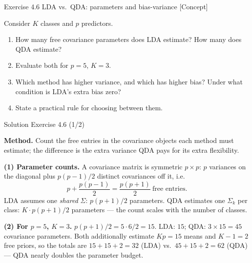 \documentclass[aspectratio=169,11pt]{beamer}
\begin{document}
\begin{frame}{Exercise 4.6 \textemdash{} LDA vs.\ QDA: parameters and bias-variance [Concept]}
\begin{exercise}
Consider $K$ classes and $p$ predictors.
\begin{enumerate}
  \item How many free covariance parameters does LDA estimate?
        How many does QDA estimate?
  \item Evaluate both for $p=5$, $K=3$.
  \item Which method has higher variance, and which has higher bias?
        Under what condition is LDA's extra bias zero?
  \item State a practical rule for choosing between them.
\end{enumerate}
\end{exercise}
\end{frame}

\begin{frame}{Solution \textemdash{} Exercise 4.6 (1/2)}
\begin{solutionbox}
\textbf{Method.} Count the free entries in the covariance objects each
method must estimate; the difference is the extra variance QDA pays for
its extra flexibility.

\vspace{1mm}
\textbf{(1) Parameter counts.}
A covariance matrix is symmetric $p\times p$: $p$ variances on the
diagonal plus $p(p-1)/2$ distinct covariances off it, i.e.\
\[
  p + \frac{p(p-1)}{2} = \frac{p(p+1)}{2} \ \text{free entries.}
\]
LDA assumes one \emph{shared} $\Sigma$: $p(p+1)/2$ parameters.
QDA estimates one $\Sigma_k$ per class: $K\cdot p(p+1)/2$ parameters
--- the count scales with the number of classes.

\vspace{1mm}
\textbf{(2) For $p=5$, $K=3$.}
$p(p+1)/2 = 5\cdot 6/2 = 15$. LDA: $15$; QDA: $3\times 15 = 45$
covariance parameters. Both additionally estimate $Kp=15$ means and
$K-1=2$ free priors, so the totals are $15+15+2=32$ (LDA) vs.\
$45+15+2=62$ (QDA) --- QDA nearly doubles the parameter budget.
\end{solutionbox}
\end{frame}
\end{document}
